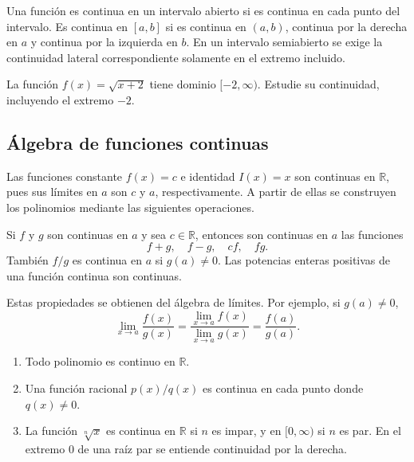 \documentclass[10pt,a5paper]{article}
\newif\ifmostrarSoluciones
\begin{document}
\begin{definicion}
Una función es continua en un intervalo abierto si es continua en cada punto del intervalo. Es continua en $[a,b]$ si es continua en $(a,b)$, continua por la derecha en $a$ y continua por la izquierda en $b$. En un intervalo semiabierto se exige la continuidad lateral correspondiente solamente en el extremo incluido.
\end{definicion}

\begin{ejemplo}
La función $f(x)=\sqrt{x+2}$ tiene dominio $[-2,\infty)$. Estudie su continuidad, incluyendo el extremo $-2$.
\end{ejemplo}
\ifmostrarSoluciones
\begin{solucion}
En $(-2,\infty)$ la raíz es continua. En el extremo,
\[
  \lim_{x\to-2^+}\sqrt{x+2}=0=f(-2).
\]
Por tanto, $f$ es continua en $[-2,\infty)$. No se exige un límite desde la izquierda de $-2$, pues allí no hay puntos de su dominio.
\end{solucion}
\else\vspace{16mm}\fi

\subsection*{Álgebra de funciones continuas}

Las funciones constante $f(x)=c$ e identidad $I(x)=x$ son continuas en $\mathbb{R}$, pues sus límites en $a$ son $c$ y $a$, respectivamente. A partir de ellas se construyen los polinomios mediante las siguientes operaciones.

\begin{teorema}
Si $f$ y $g$ son continuas en $a$ y sea $c\in\mathbb{R}$, entonces son continuas en $a$ las funciones
\[
  f+g,\quad f-g,\quad cf,\quad fg.
\]
También $f/g$ es continua en $a$ si $g(a)\neq0$. Las potencias enteras positivas de una función continua son continuas.
\end{teorema}

Estas propiedades se obtienen del álgebra de límites. Por ejemplo, si $g(a)\neq0$,
\[
  \lim_{x\to a}\frac{f(x)}{g(x)}
  =\frac{\lim_{x\to a}f(x)}{\lim_{x\to a}g(x)}
  =\frac{f(a)}{g(a)}.
\]

\begin{proposicion}
\begin{enumerate}
  \item Todo polinomio es continuo en $\mathbb{R}$.
  \item Una función racional $p(x)/q(x)$ es continua en cada punto donde $q(x)\neq0$.
  \item La función $\sqrt[n]{x}$ es continua en $\mathbb{R}$ si $n$ es impar, y en $[0,\infty)$ si $n$ es par. En el extremo $0$ de una raíz par se entiende continuidad por la derecha.
\end{enumerate}
\end{proposicion}
\end{document}
